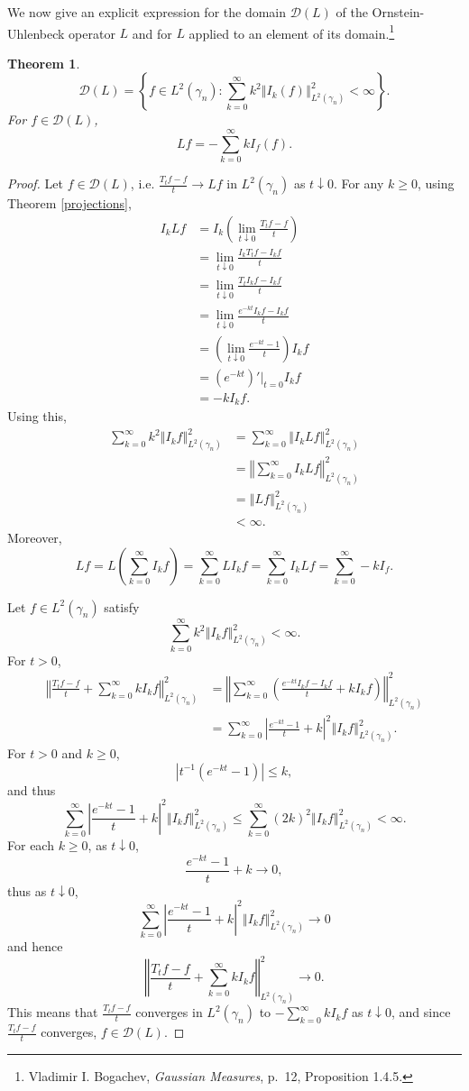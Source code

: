 \documentclass{article}
\newcommand{\norm}[1]{\left\Vert #1 \right\Vert}
\newtheorem{theorem}{Theorem}
\theoremstyle{definition}
\begin{document}
We now give an explicit expression for the domain $\mathscr{D}(L)$ of the Ornstein-Uhlenbeck operator $L$ and for $L$ applied to an element of
its domain.\footnote{Vladimir I. Bogachev, {\em Gaussian Measures}, p.~12, Proposition 1.4.5.}

\begin{theorem}
\[
\mathscr{D}(L) = \left\{f \in L^2(\gamma_n) : \sum_{k=0}^\infty k^2 \norm{I_k(f)}_{L^2(\gamma_n)}^2<\infty\right\}.
\]
For $f \in \mathscr{D}(L)$,
\[
Lf = -\sum_{k=0}^\infty k I_f(f).
\]
\end{theorem}
\begin{proof}
Let $f \in \mathscr{D}(L)$, i.e. $\frac{T_t f - f}{t} \to Lf$ in $L^2(\gamma_n)$ as $t \downarrow 0$. For any $k \geq 0$, using
Theorem \ref{projections},
\begin{align*}
I_k L f&=I_k\left(\lim_{t \downarrow 0} \frac{T_t f-f}{t} \right)\\
&=\lim_{t \downarrow 0} \frac{I_kT_t f - I_kf}{t}\\
&=\lim_{t \downarrow 0} \frac{T_t I_k f - I_k f}{t}\\
&=\lim_{t \downarrow 0}  \frac{e^{-kt} I_k f - I_k f}{t}\\
&=\left( \lim_{t \downarrow 0} \frac{e^{-kt}-1}{t}\right) I_k f\\
&=\left(e^{-kt}\right)'\big|_{t=0} I_kf\\
&=-kI_kf.
\end{align*}
Using this, 
\begin{align*}
\sum_{k=0}^\infty k^2 \norm{I_k f}_{L^2(\gamma_n)}^2&=\sum_{k=0}^\infty \norm{I_k Lf}_{L^2(\gamma_n)}^2\\
&=\norm{\sum_{k=0}^\infty I_k Lf}_{L^2(\gamma_n)}^2\\
&=\norm{Lf}_{L^2(\gamma_n)}^2\\
&<\infty.
\end{align*}
Moreover,
\[
Lf = L\left(\sum_{k=0}^\infty I_k f \right)
=\sum_{k=0}^\infty LI_k f
=\sum_{k=0}^\infty I_kLf
=\sum_{k=0}^\infty -kI_f.
\]

Let $f \in L^2(\gamma_n)$ satisfy 
\[
\sum_{k=0}^\infty k^2 \norm{I_k f}_{L^2(\gamma_n)}^2<\infty.
\]
For $t>0$,
\begin{align*}
\norm{\frac{T_t f-f}{t} + \sum_{k=0}^\infty kI_kf}_{L^2(\gamma_n)}^2&=
\norm{\sum_{k=0}^\infty \left( \frac{e^{-kt} I_k f - I_k f}{t} + kI_kf\right)}_{L^2(\gamma_n)}^2\\
&=\sum_{k=0}^\infty \left|\frac{e^{-kt}-1}{t}+k\right|^2 \norm{I_k f}_{L^2(\gamma_n)}^2.
\end{align*}
For $t>0$ and $k \geq 0$,
\[
|t^{-1}(e^{-kt}-1)| \leq k,
\]
and thus
\[
\sum_{k=0}^\infty \left|\frac{e^{-kt}-1}{t}+k\right|^2 \norm{I_k f}_{L^2(\gamma_n)}^2
\leq \sum_{k=0}^\infty (2k)^2  \norm{I_k f}_{L^2(\gamma_n)}^2
<\infty.
\]
For each $k \geq 0$, as $t \downarrow 0$, 
\[
\frac{e^{-kt}-1}{t}+k \to 0,
\]
thus as $t \downarrow 0$,
\[
\sum_{k=0}^\infty \left|\frac{e^{-kt}-1}{t}+k\right|^2 \norm{I_k f}_{L^2(\gamma_n)}^2  \to 0
\]
and hence
\[
\norm{\frac{T_t f-f}{t} + \sum_{k=0}^\infty kI_kf}_{L^2(\gamma_n)}^2 \to 0.
\]
This means that
$\frac{T_t f -f}{t}$ converges in $L^2(\gamma_n)$ to $-\sum_{k=0}^\infty kI_kf$ as $t \downarrow 0$, and since
$\frac{T_t f-f}{t}$ converges, $f \in \mathscr{D}(L)$. 
\end{proof}
\end{document}
